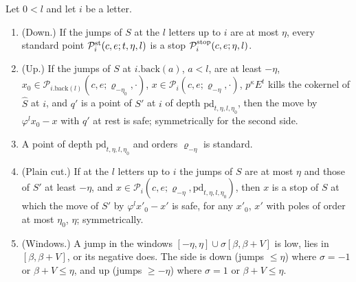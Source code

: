 \begin{lemma}\label{lem:plain-cuts}
Let $0<l$ and let $i$ be a letter.
\begin{enumerate}[label=\textup{(\alph*)}]
\item (Down.) If the jumps of $S$ at the $l$ letters up to $i$ are at most $\eta$, every standard point $\mathcal P^{\rm st}_i(c,e;t,\eta,l)$ is a stop $\mathcal P^{\rm stop}_i(c,e;\eta,l)$.
\item (Up.) If the jumps of $S$ at $i.\mathrm{back}(a)$, $a<l$, are at least $-\eta$, $x_0\in\mathcal P_{i.\mathrm{back}(l)}(c,e;\varrho_{-\eta_0},\cdot)$, $x\in\mathcal P_i(c,e;\varrho_{-\eta},\cdot)$, $p^\kappa E^t$ kills the cokernel of $\hat S$ at $i$, and $q'$ is a point of $S'$ at $i$ of depth $\mathrm{pd}_{t,\eta,l,\eta_0}$, then the
move by $\varphi^lx_0-x$ with $q'$ at rest is safe; symmetrically for the second side.
\item A point of depth $\mathrm{pd}_{t,\eta,l,\eta_0}$ and orders $\varrho_{-\eta}$ is standard.
\item (Plain cut.) If at the $l$ letters up to $i$ the jumps of $S$ are at most $\eta$ and those of $S'$ at least $-\eta$, and $x\in\mathcal P_i(c,e;\varrho_{-\eta},\mathrm{pd}_{t,\eta,l,\eta_0})$, then $x$ is a stop of $S$ at which the move of $S'$ by $\varphi^lx'_0-x'$ is safe, for any $x'_0$, $x'$ with poles of order at
most $\eta_0$, $\eta$; symmetrically.
\item (Windows.) A jump in the windows $[-\eta,\eta]\cup\sigma[\beta,\beta+V]$ is low, lies in $[\beta,\beta+V]$, or its negative does. The side is down (jumps $\le\eta$) where $\sigma=-1$ or $\beta+V\le\eta$, and up (jumps $\ge-\eta$) where $\sigma=1$ or $\beta+V\le\eta$.
\end{enumerate}
\end{lemma}

